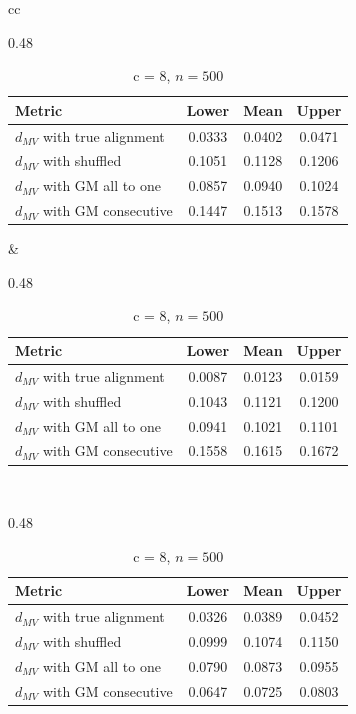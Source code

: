 \documentclass[12pt]{article}
\theoremstyle{definition}
\begin{document}
\begin{table}
\centering
\begin{tabular}{cc}
\begin{subtable}[t]{0.48\textwidth}
\centering
\begin{tabular}{lccc}
\hline
\textbf{Metric} & \textbf{Lower} & \textbf{Mean} & \textbf{Upper} \\
\hline
$d_{MV}$ with true alignment & 0.0333 & 0.0402 & 0.0471 \\
$d_{MV}$ with shuffled        & 0.1051 & 0.1128 & 0.1206 \\
$d_{MV}$ with GM all to one       & 0.0857 & 0.0940 & 0.1024 \\
$d_{MV}$ with GM consecutive      & 0.1447 & 0.1513 & 0.1578 \\
\hline
\end{tabular} 
\caption{c = 4, $n = 500$}
\end{subtable}
&
\begin{subtable}[t]{0.48\textwidth}
\centering
\begin{tabular}{lccc}
\hline
\textbf{Metric} & \textbf{Lower} & \textbf{Mean} & \textbf{Upper} \\
\hline
$d_{MV}$ with true alignment & 0.0087 & 0.0123 & 0.0159 \\
$d_{MV}$ with shuffled        & 0.1043 & 0.1121 & 0.1200 \\
$d_{MV}$ with GM all to one       & 0.0941 & 0.1021 & 0.1101 \\
$d_{MV}$ with GM consecutive      & 0.1558 & 0.1615 & 0.1672 \\
\hline
\end{tabular}
\caption{c = 4, $n = 800$}
\end{subtable}
\\[12ex]
\begin{subtable}[t]{0.48\textwidth}
\centering
\begin{tabular}{lccc}
\hline
\textbf{Metric} & \textbf{Lower} & \textbf{Mean} & \textbf{Upper} \\
\hline
$d_{MV}$ with true alignment & 0.0326 & 0.0389 & 0.0452 \\
$d_{MV}$ with shuffled        & 0.0999 & 0.1074 & 0.1150 \\
$d_{MV}$ with GM all to one       & 0.0790 & 0.0873 & 0.0955 \\
$d_{MV}$ with GM consecutive      & 0.0647 & 0.0725 & 0.0803 \\
\hline
\end{tabular}
\caption{c = 8, $n = 500$}

\end{subtable}
\end{tabular}
\end{table}
\end{document}
